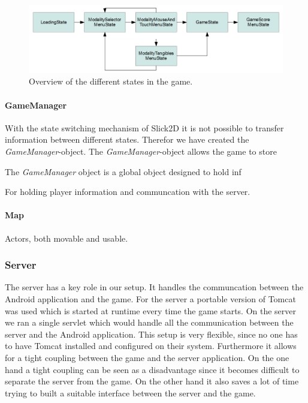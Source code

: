 \documentclass[a4paper,10pt]{article}
\begin{document}
		\begin{figure}
			\includegraphics[width=\columnwidth]{images/game-state-diagram.png}
			\caption{Overview of the different states in the game.}
			\label{fig:game-state-diagram}
		\end{figure}
		
		\paragraph{GameManager}
		With the state switching mechanism of Slick2D it is not possible to transfer information between different states.
		Therefor we have created the \emph{GameManager}-object.
		The \emph{GameManager}-object allows the game to store 
		
		The \emph{GameManager} object is a global object designed to hold inf
		
		For holding player information and communcation with the server.
		
		
		\paragraph{Map}
		Actors, both movable and usable.
		
		
		\subsubsection{Server}
		The server has a key role in our setup.
		It handles the communcation between the Android application and the game.
		For the server a portable version of Tomcat was used which is started at runtime every time the game starts.
		On the server we ran a single servlet which would handle all the communication between the server and the Android application.
		This setup is very flexible, since no one has to have Tomcat installed and configured on their system.
		Furthermore it allows for a tight coupling between the game and the server application.
		On the one hand a tight coupling can be seen as a disadvantage since it becomes difficult to separate the server from the game.
		On the other hand it also saves a lot of time trying to built a suitable interface between the server and the game.
				
\end{document}
